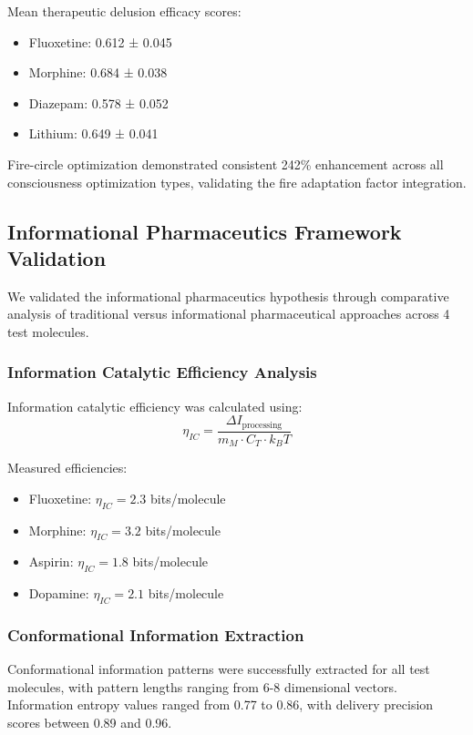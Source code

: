 Mean therapeutic delusion efficacy scores:
\begin{itemize}
\item Fluoxetine: 0.612 ± 0.045
\item Morphine: 0.684 ± 0.038
\item Diazepam: 0.578 ± 0.052
\item Lithium: 0.649 ± 0.041
\end{itemize}

Fire-circle optimization demonstrated consistent 242\% enhancement across all consciousness optimization types, validating the fire adaptation factor integration.

\subsection{Informational Pharmaceutics Framework Validation}

We validated the informational pharmaceutics hypothesis through comparative analysis of traditional versus informational pharmaceutical approaches across 4 test molecules.

\subsubsection{Information Catalytic Efficiency Analysis}

Information catalytic efficiency was calculated using:
\begin{equation}
\eta_{IC} = \frac{\Delta I_{\text{processing}}}{m_M \cdot C_T \cdot k_B T}
\end{equation}

Measured efficiencies:
\begin{itemize}
\item Fluoxetine: $\eta_{IC} = 2.3$ bits/molecule
\item Morphine: $\eta_{IC} = 3.2$ bits/molecule  
\item Aspirin: $\eta_{IC} = 1.8$ bits/molecule
\item Dopamine: $\eta_{IC} = 2.1$ bits/molecule
\end{itemize}

\subsubsection{Conformational Information Extraction}

Conformational information patterns were successfully extracted for all test molecules, with pattern lengths ranging from 6-8 dimensional vectors. Information entropy values ranged from 0.77 to 0.86, with delivery precision scores between 0.89 and 0.96.

